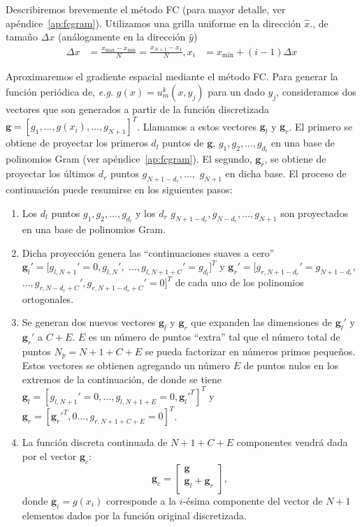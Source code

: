 Describiremos brevemente el método FC (para mayor detalle, ver apéndice~\ref{ap:fcgram}). 
Utilizamos una grilla uniforme en la dirección $\hat x$., 
de tamaño $\Delta x$ (análogamente en la dirección $\hat y$)
\begin{equation*}
\begin{aligned}
\Delta x &=\frac{x_{\text{max}}-x_{\text{min}}}{N} = \frac{x_{N+1} - x_1}{N} ,
x_i &=x_{\mathrm{min}}+(i-1)\Delta x
\end{aligned}
\end{equation*} 

Aproximaremos el gradiente espacial mediante el método FC.
Para generar la función periódica de, \textit{e.g.} $g(x)=u^k_m(x,y_j)$ para un dado $y_j$, 
consideramos dos vectores 
que son generados a partir de la función discretizada 
$\mathbf{g}=[g_1,\ldots,g(x_i),\ldots,g_{N+1}]^T$. Llamamos a estos vectores
$\mathbf{g}_l$ y $\mathbf{g}_r$. El primero 
se obtiene de proyectar los primeros $d_l$ puntos de $\mathbf{g}$, $g_1,g_2,\ldots,g_{d_l}$ 
en una base de polinomios Gram (ver apéndice~\ref{ap:fcgram}). El segundo, $\mathbf{g}_r$, se 
obtiene de proyectar los últimos $d_r$ puntos $g_{N+1-d_r},\ldots,$ $g_{N+1}$ en dicha base. 
El proceso de continuación puede resumirse en los siguientes pasos:
\begin{enumerate}
\item Los $d_l$ puntos $g_1,g_2,\ldots,g_{d_l}$
y los $d_r$ $g_{N+1-d_r},g_{N-d_r},\ldots,g_{N+1}$ 
son proyectados en una base de polinomios Gram.

\item Dicha proyección genera las ``continuaciones suaves a cero'' 
$\mathbf{g}_l'=[g_{l,N+1}'=0,g_{l,N}',$ $\ldots,g_{l,N+1+C}'=g_{d_l}]^T$ y 
$\mathbf{g}_r'=[g_{r,N+1-d_r}'=g_{N+1-d_r},$ $\ldots,g_{r,N-d_r+C}',
g_{r,N+1-d_r+C}'=0]^T$ de cada 
uno de los polinomios ortogonales.

\item Se generan dos nuevos vectores $\mathbf{g}_l$ y $\mathbf{g}_r$ 
que expanden las dimensiones de $\mathbf{g}_l'$ y $\mathbf{g}_r'$ a $C+E$. 
$E$ es un número de puntos ``extra'' tal que el número total de puntos 
$N_p=N+1+C+E$ se pueda factorizar en números primos pequeños. Estos 
vectores se obtienen agregando un número $E$ de puntos nulos 
en los extremos de la continuación, de donde se tiene 
$\mathbf{g}_l=[g_{l,N+1}'=0,\ldots,g_{l,N+1+E}=0,\mathbf{g}_l'^T]^T$
y $\mathbf{g}_r=[\mathbf{g}_r'^T,0\ldots,g_{r,N+1+C+E}=0]^T$.

\item La función discreta continuada de $N+1+C+E$ componentes 
vendrá dada por el vector $\mathbf{g}_c$:  
\begin{equation*}
\mathbf{g}_c=
\begin{bmatrix}
    \mathbf{g} \\
    \mathbf{g}_l+\mathbf{g}_r  \\
\end{bmatrix}
,
\label{eq:FCStepsCondensed}
\end{equation*}
donde $\mathbf{g}_i=g(x_i)$ corresponde a la $i$-ésima componente del vector 
de $N+1$ elementos dados por la función original discretizada.
\end{enumerate}

